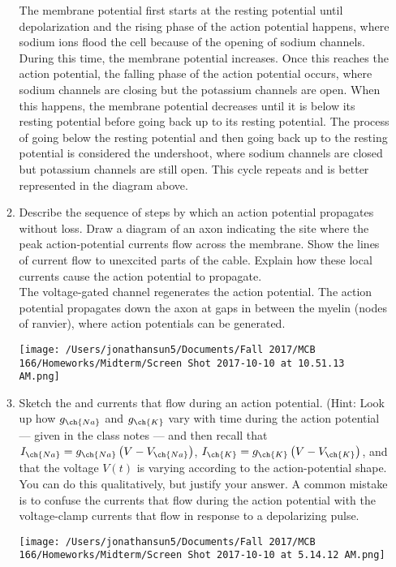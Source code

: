 \documentclass[11pt]{article}
\begin{document}
\begin{enumerate}[label=\arabic*.]
\begin{enumerate}[label=(\alph*)]
The membrane potential first starts at the resting potential until depolarization and the rising phase of the action potential happens, where sodium ions flood the cell because of the opening of sodium channels. During this time, the membrane potential increases. Once this reaches the action potential, the falling phase of the action potential occurs, where sodium channels are closing but the potassium channels are open. When this happens, the membrane potential decreases until it is below its resting potential before going back up to its resting potential. The process of going below the resting potential and then going back up to the resting potential is considered the undershoot, where sodium channels are closed but potassium channels are still open. This cycle repeats and is better represented in the diagram above.



\newpage
\item
Describe the sequence of steps by which an action potential propagates without loss. Draw a diagram of an axon indicating the site where the peak action-potential currents flow across the membrane. Show the lines of current flow to unexcited parts of the cable. Explain how these local currents cause the action potential to propagate.
\vspace*{1\baselineskip}
\\
The voltage-gated channel regenerates the action potential. The action potential propagates down the axon at gaps in between the myelin (nodes of ranvier), where action potentials can be generated.
\begin{center}
\texttt{[image: /Users/jonathansun5/Documents/Fall 2017/MCB 166/Homeworks/Midterm/Screen Shot 2017-10-10 at 10.51.13 AM.png]}
\end{center}



\newpage
\item
Sketch the  and  currents that flow during an action potential. (Hint: Look up how $g_{\ch{Na}}$ and $g_{\ch{K}}$ vary with time during the action potential --- given in the class notes --- and then recall that $I_{\ch{Na}} = g_{\ch{Na}} \left(V - V_{\ch{Na}}\right)$, $I_{\ch{K}} = g_{\ch{K}} \left(V - V_{\ch{K}}\right)$, and that the voltage $V(t)$ is varying according to the action-potential shape. You can do this qualitatively, but justify your answer. A common mistake is to confuse the currents that flow during the action potential with the voltage-clamp currents that flow in response to a depolarizing pulse.
\begin{center}
\texttt{[image: /Users/jonathansun5/Documents/Fall 2017/MCB 166/Homeworks/Midterm/Screen Shot 2017-10-10 at 5.14.12 AM.png]}
\end{center}




\end{enumerate}
\end{enumerate}
\end{document}
